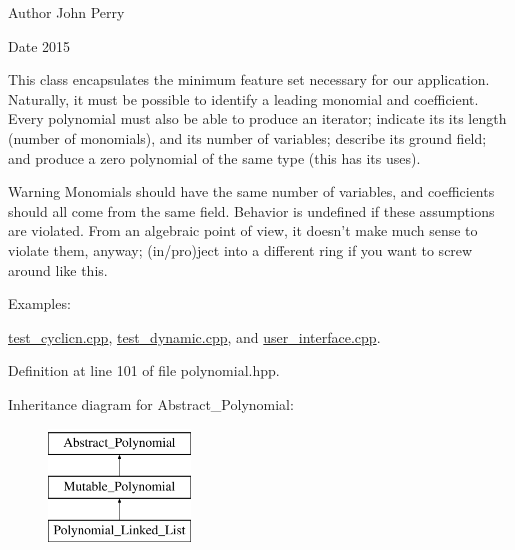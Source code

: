 \begin{DoxyAuthor}{Author}
John Perry 
\end{DoxyAuthor}
\begin{DoxyDate}{Date}
2015
\end{DoxyDate}
This class encapsulates the minimum feature set necessary for our application. Naturally, it must be possible to identify a leading monomial and coefficient. Every polynomial must also be able to produce an iterator; indicate its its length (number of monomials), and its number of variables; describe its ground field; and produce a zero polynomial of the same type (this has its uses).

\begin{DoxyWarning}{Warning}
Monomials should have the same number of variables, and coefficients should all come from the same field. Behavior is undefined if these assumptions are violated. From an algebraic point of view, it doesn't make much sense to violate them, anyway; (in/pro)ject into a different ring if you want to screw around like this. 
\end{DoxyWarning}
\begin{Desc}
\item[Examples\+: ]\par
\hyperlink{test_cyclicn_8cpp-example}{test\+\_\+cyclicn.\+cpp}, \hyperlink{test_dynamic_8cpp-example}{test\+\_\+dynamic.\+cpp}, and \hyperlink{user_interface_8cpp-example}{user\+\_\+interface.\+cpp}.\end{Desc}


Definition at line 101 of file polynomial.\+hpp.

Inheritance diagram for Abstract\+\_\+\+Polynomial\+:\begin{figure}[H]
\begin{center}
\leavevmode
\includegraphics[height=3.000000cm]{group__polygroup}
\end{center}
\end{figure}
